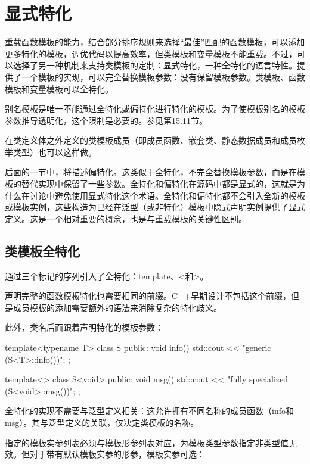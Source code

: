 \section{显式特化}

重载函数模板的能力，结合部分排序规则来选择“最佳”匹配的函数模板，可以添加更多特化的模板，调优代码以提高效率，但类模板和变量模板不能重载。不过，可以选择了另一种机制来支持类模板的定制：显式特化，一种全特化的语言特性。提供了一个模板的实现，可以完全替换模板参数：没有保留模板参数。类模板、函数模板和变量模板可以全特化。

\begin{notice}
别名模板是唯一不能通过全特化或偏特化进行特化的模板。为了使模板别名的模板参数推导透明化，这个限制是必要的。参见第15.11节。
\end{notice}

在类定义体之外定义的类模板成员（即成员函数、嵌套类、静态数据成员和成员枚举类型）也可以这样做。

后面的一节中，将描述偏特化。这类似于全特化，不完全替换模板参数，而是在模板的替代实现中保留了一些参数。全特化和偏特化在源码中都是显式的，这就是为什么在讨论中避免使用显式特化这个术语。全特化和偏特化都不会引入全新的模板或模板实例，这些构造为已经在泛型（或非特化）模板中隐式声明实例提供了显式定义。这是一个相对重要的概念，也是与重载模板的关键性区别。

\subsection{类模板全特化}

通过三个标记的序列引入了全特化：template、<和>。

\begin{notice}
声明完整的函数模板特化也需要相同的前缀。C++早期设计不包括这个前缀，但是成员模板的添加需要额外的语法来消除复杂的特化歧义。
\end{notice}

此外，类名后面跟着声明特化的模板参数：

\begin{cpp}
template<typename T>
class S {
	public:
	void info() {
		std::cout << "generic (S<T>::info())\n";
	}
};

template<>
class S<void> {
	public:
	void msg() {
		std::cout << "fully specialized (S<void>::msg())\n";
	}
};
\end{cpp}

全特化的实现不需要与泛型定义相关：这允许拥有不同名称的成员函数（info和msg）。其与泛型定义的关联，仅决定类模板的名称。

指定的模板实参列表必须与模板形参列表对应，为模板类型参数指定非类型值无效。但对于带有默认模板实参的形参，模板实参可选：

